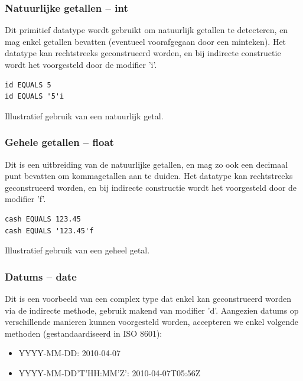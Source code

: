 \subsubsection{Natuurlijke getallen -- int}

Dit primitief datatype wordt gebruikt om natuurlijk getallen te detecteren, en mag enkel getallen bevatten (eventueel voorafgegaan door een minteken). Het datatype kan rechtstreeks geconstrueerd worden, en bij indirecte constructie wordt het voorgesteld door de modifier 'i'.

\begin{code}
\begin{verbatim}
id EQUALS 5
id EQUALS '5'i
\end{verbatim}
\caption{Illustratief gebruik van een natuurlijk getal.}
\end{code}

\subsubsection{Gehele getallen -- float}

Dit is een uitbreiding van de natuurlijke getallen, en mag zo ook een decimaal punt bevatten om kommagetallen aan te duiden. Het datatype kan rechtstreeks geconstrueerd worden, en bij indirecte constructie wordt het voorgesteld door de modifier 'f'.

\begin{code}
\begin{verbatim}
cash EQUALS 123.45
cash EQUALS '123.45'f
\end{verbatim}
\caption{Illustratief gebruik van een geheel getal.}
\end{code}

\subsubsection{Datums -- date}

Dit is een voorbeeld van een complex type dat enkel kan geconstrueerd worden via de indirecte methode, gebruik makend van modifier 'd'. Aangezien datums op verschillende manieren kunnen voorgesteld worden, accepteren we enkel volgende methoden (gestandaardiseerd in ISO 8601):
\begin{itemize}
\item{YYYY-MM-DD: 2010-04-07}
\item{YYYY-MM-DD'T'HH:MM'Z': 2010-04-07T05:56Z}
\end{itemize}

